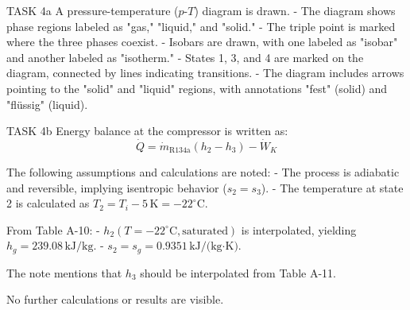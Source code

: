 TASK 4a  
A pressure-temperature (\( p \)-\( T \)) diagram is drawn.  
- The diagram shows phase regions labeled as "gas," "liquid," and "solid."  
- The triple point is marked where the three phases coexist.  
- Isobars are drawn, with one labeled as "isobar" and another labeled as "isotherm."  
- States 1, 3, and 4 are marked on the diagram, connected by lines indicating transitions.  
- The diagram includes arrows pointing to the "solid" and "liquid" regions, with annotations "fest" (solid) and "flüssig" (liquid).  

TASK 4b  
Energy balance at the compressor is written as:  
\[
\dot{Q} = \dot{m}_{\text{R134a}} (h_2 - h_3) - \dot{W}_K
\]

The following assumptions and calculations are noted:  
- The process is adiabatic and reversible, implying isentropic behavior (\( s_2 = s_3 \)).  
- The temperature at state 2 is calculated as \( T_2 = T_i - 5 \, \text{K} = -22^\circ\text{C} \).  

From Table A-10:  
- \( h_2(T = -22^\circ\text{C}, \text{saturated}) \) is interpolated, yielding \( h_g = 239.08 \, \text{kJ/kg} \).  
- \( s_2 = s_g = 0.9351 \, \text{kJ/(kg·K)} \).  

The note mentions that \( h_3 \) should be interpolated from Table A-11.  

No further calculations or results are visible.